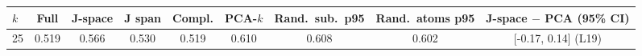 \begin{tabular}{lcccccccc}\toprule
$k$ & Full & J-space & J span & Compl. & PCA-$k$ & Rand.\ sub.\ p95 & Rand.\ atoms p95 & J-space $-$ PCA (95\% CI)\\\midrule
25 & 0.519 & 0.566 & 0.530 & 0.519 & 0.610 & 0.608 & 0.602 & [-0.17, 0.14] (L19)\\
\bottomrule\end{tabular}
